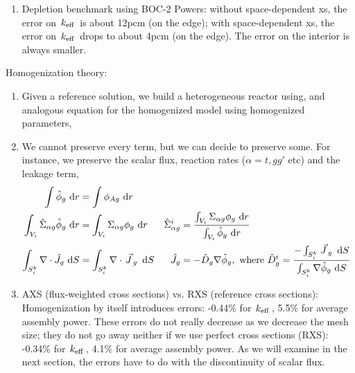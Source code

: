 \documentclass{school-22.211-notes}
\begin{document}
\begin{enumerate}
\item Depletion benchmark using BOC-2 Powers: without space-dependent xs, the error on $\left. k_{\mathrm{eff}} \right.$ is about 12pcm (on the edge); with space-dependent xs, the error on $\left. k_{\mathrm{eff}} \right.$ drops to about 4pcm (on the edge). The error on the interior is always smaller. 
\end{enumerate}

\clearpage
{}
Homogenization theory: 
\begin{enumerate}
\item Given a reference solution, we build a heterogeneous reactor using,
and analogous equation for the homogenized model using homogenized parameters,

\item We cannot preserve every term, but we can decide to preserve some. For instance, we preserve the scalar flux, reaction rates ($\alpha = t, gg'$ etc) and the leakage term, 
\begin{align}
\int \hat{\phi}_g \mbox{ }\mathrm{d} r &= \int \phi_{Ag} \mbox{ }\mathrm{d} r  \\
\int_{V_i} \hat{\Sigma}_{\alpha g} \hat{\phi}_g \mbox{ }\mathrm{d} r &= \int_{V_i} \Sigma_{\alpha g} \phi_g \mbox{ }\mathrm{d} r  & \hat{\Sigma}_{\alpha g}^i &= \frac{\int_{V_i} \Sigma_{\alpha g} \phi_g \mbox{ }\mathrm{d} r}{\int_{V_i} \hat{\phi}_g \mbox{ }\mathrm{d} r} \\
\int_{S_i^k} \nabla \cdot \hat{J}_g \mbox{ }\mathrm{d} S &= \int_{S_i^k} \nabla \cdot \left.\vec{J}\right._g \mbox{ }\mathrm{d} S & \hat{J}_g &= - \hat{D}_g \nabla \hat{\phi}_g, \mbox{ where } \hat{D}_g^i = \frac{-\int_{S_i^k} \left.\vec{J}\right._g \mbox{ }\mathrm{d} S}{\int_{S_i^k} \nabla \hat{\phi}_g \mbox{ }\mathrm{d} S}
\end{align}

\item AXS (flux-weighted cross sections) vs. RXS (reference cross sections): Homogenization by itself introduces errors: -0.44\% for $\left. k_{\mathrm{eff}} \right.$, 5.5\% for average assembly power. These errors do not really decrease as we decrease the mesh size; they do not go away neither if we use perfect cross sections (RXS): -0.34\% for $\left. k_{\mathrm{eff}} \right.$, 4.1\% for average assembly power. As we will examine in the next section, the errors have to do with the discontinuity of scalar flux. 


\end{enumerate}
\end{document}
